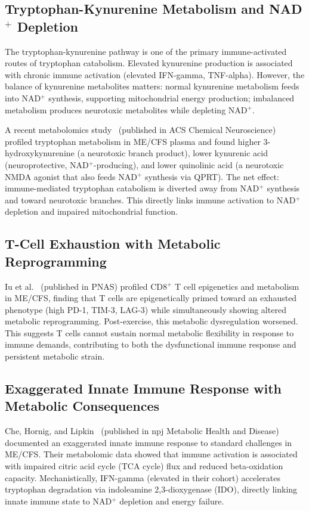 \subsection{Tryptophan-Kynurenine Metabolism and NAD$^+$ Depletion}

The tryptophan-kynurenine pathway is one of the primary immune-activated routes of tryptophan catabolism. Elevated kynurenine production is associated with chronic immune activation (elevated IFN-gamma, TNF-alpha). However, the balance of kynurenine metabolites matters: normal kynurenine metabolism feeds into NAD$^+$ synthesis, supporting mitochondrial energy production; imbalanced metabolism produces neurotoxic metabolites while depleting NAD$^+$.

A recent metabolomics study~\cite{Abujrais2024tryptophan} (published in ACS Chemical Neuroscience) profiled tryptophan metabolism in ME/CFS plasma and found higher 3-hydroxykynurenine (a neurotoxic branch product), lower kynurenic acid (neuroprotective, NAD$^+$-producing), and lower quinolinic acid (a neurotoxic NMDA agonist that also feeds NAD$^+$ synthesis via QPRT). The net effect: immune-mediated tryptophan catabolism is diverted away from NAD$^+$ synthesis and toward neurotoxic branches. This directly links immune activation to NAD$^+$ depletion and impaired mitochondrial function.

\subsection{T-Cell Exhaustion with Metabolic Reprogramming}

Iu et al.~\cite{iu2024tcell_exhaustion} (published in PNAS) profiled CD8$^+$ T cell epigenetics and metabolism in ME/CFS, finding that T cells are epigenetically primed toward an exhausted phenotype (high PD-1, TIM-3, LAG-3) while simultaneously showing altered metabolic reprogramming. Post-exercise, this metabolic dysregulation worsened. This suggests T cells cannot sustain normal metabolic flexibility in response to immune demands, contributing to both the dysfunctional immune response and persistent metabolic strain.

\subsection{Exaggerated Innate Immune Response with Metabolic Consequences}

Che, Hornig, and Lipkin~\cite{Che2025} (published in npj Metabolic Health and Disease) documented an exaggerated innate immune response to standard challenges in ME/CFS. Their metabolomic data showed that immune activation is associated with impaired citric acid cycle (TCA cycle) flux and reduced beta-oxidation capacity. Mechanistically, IFN-gamma (elevated in their cohort) accelerates tryptophan degradation via indoleamine 2,3-dioxygenase (IDO), directly linking innate immune state to NAD$^+$ depletion and energy failure.

